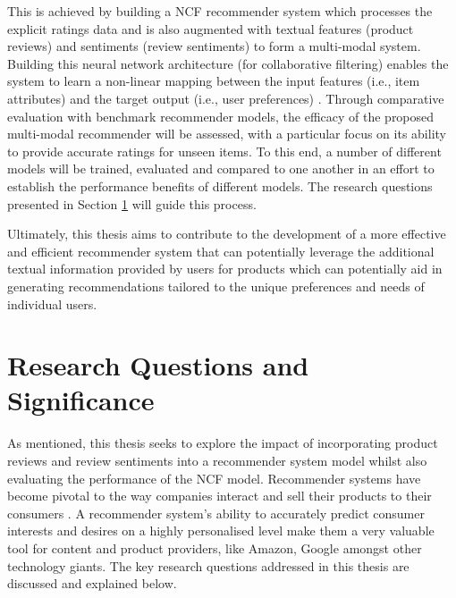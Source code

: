 This is achieved by building a NCF recommender system which processes the explicit ratings data and is also augmented with textual features (product reviews) and sentiments (review sentiments) to form a multi-modal system. Building this neural network architecture (for collaborative filtering) enables the system to learn a non-linear mapping between the input features (i.e., item attributes) and the target output (i.e., user preferences) \cite{he2017neural}. Through comparative evaluation with benchmark recommender models, the efficacy of the proposed multi-modal recommender will be assessed, with a particular focus on its ability to provide  accurate ratings for unseen items. To this end, a number of different models will be trained, evaluated and compared to one another in an effort to establish the performance benefits of different models. The research questions presented in Section \ref{sec:1 Research Questions and Significance} will guide this process.

Ultimately, this thesis aims to contribute to the development of a more effective and efficient recommender system that can potentially leverage the additional textual information provided by users for products which can potentially aid in generating recommendations tailored to the unique preferences and needs of individual users.

\section{Research Questions and Significance}
\label{sec:1 Research Questions and Significance}

As mentioned, this thesis seeks to explore the impact of incorporating product reviews and review sentiments into a recommender system model whilst also evaluating the performance of the NCF model. Recommender systems have become pivotal to the way companies interact and sell their products to their consumers \cite{steck2021deep}. A recommender system’s ability to accurately predict consumer interests and desires on a highly personalised level make them a very valuable tool for content and product providers, like Amazon, Google amongst other technology giants. The key research questions addressed in this thesis are discussed and explained below. 






